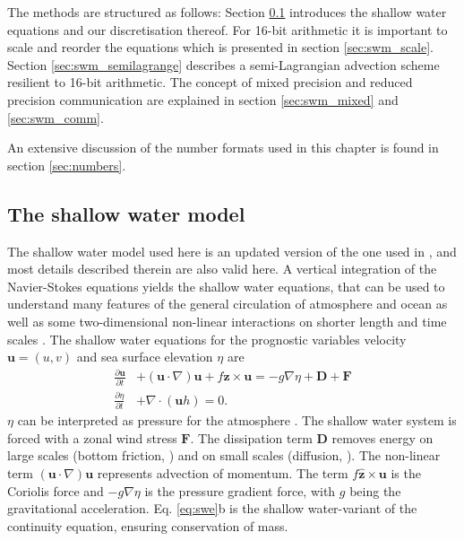 The methods are structured as follows: Section \ref{sec:swm_swm} introduces the shallow water equations and our
discretisation thereof. For 16-bit arithmetic it is important to scale and reorder the equations which is presented in 
section \ref{sec:swm_scale}. Section \ref{sec:swm_semilagrange} describes a semi-Lagrangian advection scheme
resilient to 16-bit arithmetic. The concept of mixed precision and reduced precision communication are explained
in section \ref{sec:swm_mixed} and \ref{sec:swm_comm}.

An extensive discussion of the number formats used in this chapter is found in section \ref{sec:numbers}.

\subsection{The shallow water model}
\label{sec:swm_swm}

The shallow water model used here is an updated version of the one used in \cite{Klower2019a}, and most details described
therein are also valid here. A vertical integration of the Navier-Stokes equations yields the shallow water equations, that can
be used to understand many features of the general circulation of atmosphere and ocean as well as some two-dimensional
non-linear interactions on shorter length and time scales \citep{Gill1982,Vallis2006}. The shallow water equations for the
prognostic variables velocity $\mathbf{u} = (u,v)$ and sea surface elevation $\eta$ are
\begin{subequations}
\begin{align}
\frac{\partial \mathbf{u}}{\partial t} &+ (\mathbf{u} \cdot \nabla) \mathbf{u} +
f\hat{\mathbf{z}} \times \mathbf{u} = -g\nabla \eta + \mathbf{D} + \mathbf{F} \\
\frac{\partial \eta}{\partial t} &+ \nabla \cdot (\mathbf{u}h) = 0.
\end{align}
\label{eq:swe}%
\end{subequations}
$\eta$ can be interpreted as pressure for the atmosphere \citep{Gill1982}. The shallow water system is forced with a zonal
wind stress $\mathbf{F}$. The dissipation term $\mathbf{D}$ removes energy on large scales (bottom friction, \cite{Arbic2008})
and on small scales (diffusion, \citep{Griffies2000}). The non-linear term $(\mathbf{u} \cdot \nabla) \mathbf{u}$ represents advection of
momentum. The term $f\hat{\mathbf{z}} \times \mathbf{u}$ is the Coriolis force and $-g\nabla \eta$ is the pressure gradient
force, with $g$ being the gravitational acceleration. Eq. \ref{eq:swe}b is the shallow water-variant of the continuity equation,
ensuring conservation of mass.

